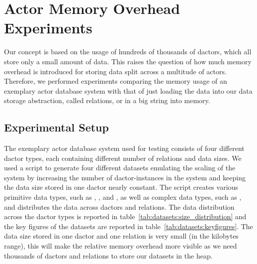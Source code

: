 
\section{Actor Memory Overhead Experiments}\label{sec:experiments}

  Our concept is based on the usage of hundreds of thousands of \glspl{dactor}, which all store only a small amount of data.
  This raises the question of how much memory overhead is introduced for storing data split across a multitude of actors.
  Therefore, we performed experiments comparing the memory usage of an exemplary actor database system with that of just loading the data into our data storage abstraction, called relations, or in a big string into memory.

\subsection{Experimental Setup}

  The exemplary actor database system used for testing consists of four different \gls{dactor} types, each containing different number of relations and data sizes.
  We used a script to generate four different datasets emulating the scaling of the system by increasing the number of \gls{dactor}-instances in the system and keeping the data size stored in one \gls{dactor} nearly constant.
  The script creates various primitive data types, such as , , and , as well as complex data types, such as , and distributes the data across \glspl{dactor} and relations.
  The data distribution across the \gls{dactor} types is reported in table~\ref{tab:datasets:size_distribution} and the key figures of the datasets are reported in table~\ref{tab:datasets:keyfigures}.
  The data size stored in one \gls{dactor} and one relation is very small (in the kilobytes range), this will make the relative memory overhead more visible as we need thousands of \glspl{dactor} and relations to store our datasets in the heap.
  
